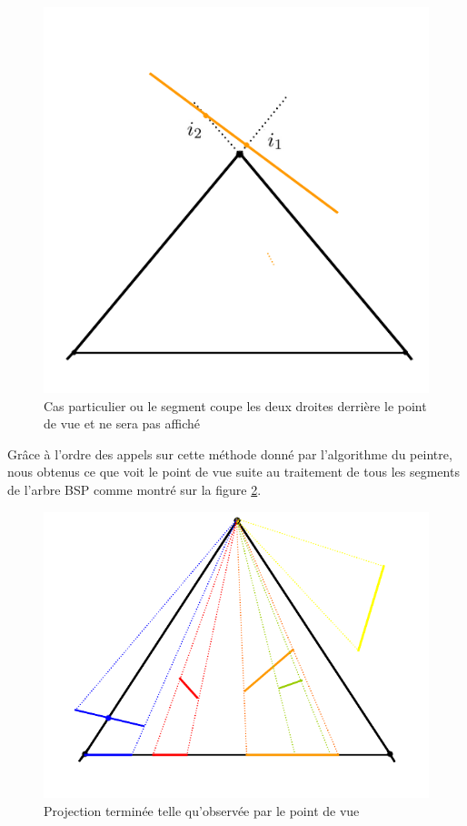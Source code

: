\documentclass[11pt,a4paper]{article}
\theoremstyle{definition}
\theoremstyle{remark}
\begin{document}
\begin{figure}[H]
\centering
\includegraphics[scale=0.4]{casSpecial3.png}
\caption{Cas particulier ou le segment coupe les deux droites derrière le point de vue et ne sera pas affiché}
\label{exp_6}
\end{figure}

Grâce à l'ordre des appels sur cette méthode donné par l'algorithme du peintre, nous obtenus ce que voit le point de vue suite au traitement de tous les segments de l'arbre BSP comme montré sur la figure \ref{algofini}.

\begin{figure}[H]
\centering
\includegraphics[scale=0.4]{fini.png}
\caption{Projection terminée telle qu'observée par le point de vue}
\label{algofini}
\end{figure}
\end{document}
